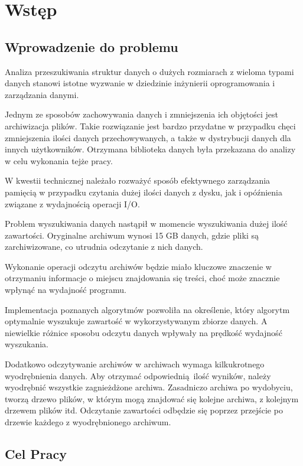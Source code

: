 \chapter{Wstęp}

\section{Wprowadzenie do problemu}
Analiza przeszukiwania struktur danych o dużych rozmiarach z wieloma typami danych stanowi
istotne wyzwanie w dziedzinie inżynierii oprogramowania i zarządzania danymi. 

Jednym ze sposobów zachowywania danych i zmniejszenia ich objętości jest 
archiwizacja plików. Takie rozwiązanie jest bardzo przydatne w przypadku chęci
zmniejszenia ilości danych przechowywanych, a także w dystrybucji danych dla
innych użytkowników. Otrzymana biblioteka danych była przekazana do analizy w 
celu wykonania tejże pracy.

W kwestii technicznej należało rozważyć sposób efektywnego zarządzania pamięcią
w przypadku czytania dużej ilości danych z dysku, jak i opóźnienia związane z 
wydajnością operacji I/O.

Problem wyszukiwania danych nastąpił w momencie wyszukiwania dużej ilość 
zawartości. Oryginalne archiwum wynosi 15 GB danych, gdzie pliki są 
zarchiwizowane, co utrudnia odczytanie z nich danych. 

Wykonanie operacji odczytu archiwów będzie miało kluczowe znaczenie w 
otrzymaniu informacje o miejscu znajdowania się treści, choć może znacznie 
wpłynąć na wydajność programu.

Implementacja poznanych algorytmów pozwoliła na określenie, który algorytm 
optymalnie wyszukuje zawartość w wykorzystywanym zbiorze danych. A niewielkie
różnice sposobu odczytu danych wpływały na prędkość wydajność wyszukania.

Dodatkowo odczytywanie archiwów w archiwach wymaga kilkukrotnego wyodrębnienia
danych. Aby otrzymać odpowiednią ilość wyników, należy wyodrębnić 
wszystkie zagnieżdżone archiwa. Zasadniczo archiwa po wydobyciu,
tworzą drzewo plików, w którym mogą znajdować się kolejne archiwa, z kolejnym drzewem
plików itd. Odczytanie zawartości odbędzie się poprzez przejście po drzewie 
każdego z wyodrębnionego archiwum.

\section{Cel Pracy}

